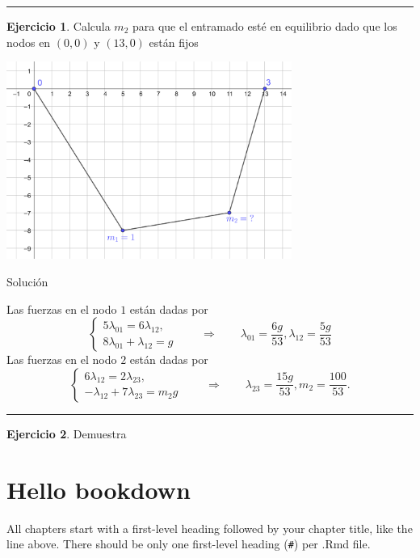 \documentclass[
]{book}
\theoremstyle{definition}
\theoremstyle{definition}
\theoremstyle{definition}
\newtheorem{exercise}{Ejercicio}[chapter]
\theoremstyle{definition}
\theoremstyle{remark}
\begin{document}
\begin{center}\rule{0.5\linewidth}{0.5pt}\end{center}

\begin{exercise}
Calcula \(m_2\) para que el entramado esté en equilibrio dado que los nodos en \((0,0)\) y \((13,0)\) están fijos

\includegraphics[width=0.7\textwidth,height=\textheight]{./eje_1.png}
\end{exercise}

Solución

Las fuerzas en el nodo \(1\) están dadas por
\[
\begin{cases}
5\lambda_{01}=6\lambda_{12},\\
8\lambda_{01}+\lambda_{12}=g
\end{cases} \qquad\Rightarrow\qquad \lambda_{01}=\frac{6g}{53}, \lambda_{12}=\frac{5g}{53}
\]
Las fuerzas en el nodo \(2\) están dadas por
\[
\begin{cases}
6\lambda_{12}=2\lambda_{23},\\
-\lambda_{12}+7\lambda_{23}=m_2g
\end{cases} \qquad\Rightarrow\qquad \lambda_{23}=\frac{15g}{53}, m_2=\frac{100}{53}.
\]

\begin{center}\rule{0.5\linewidth}{0.5pt}\end{center}

\begin{exercise}
Demuestra
\end{exercise}

\hypertarget{hello-bookdown}{%
\chapter{Hello bookdown}\label{hello-bookdown}}

All chapters start with a first-level heading followed by your chapter title, like the line above. There should be only one first-level heading (\texttt{\#}) per .Rmd file.
\end{document}
